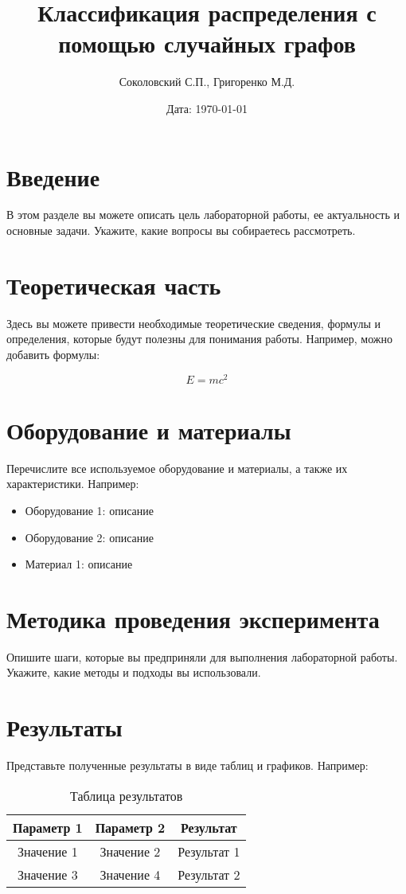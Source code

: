 \documentclass[a4paper,12pt]{article}
\title{\textbf{Классификация распределения с помощью случайных графов}}
\author{Соколовский С.П., Григоренко М.Д.}
\date{Дата: \today}
\begin{document}
\maketitle

\section{Введение}
В этом разделе вы можете описать цель лабораторной работы, ее актуальность и основные задачи. Укажите, какие вопросы вы собираетесь рассмотреть.

\section{Теоретическая часть}
Здесь вы можете привести необходимые теоретические сведения, формулы и определения, которые будут полезны для понимания работы. Например, можно добавить формулы:

\begin{equation}
E = mc^2
\end{equation}

\section{Оборудование и материалы}
Перечислите все используемое оборудование и материалы, а также их характеристики. Например:
\begin{itemize}
    \item Оборудование 1: описание
    \item Оборудование 2: описание
    \item Материал 1: описание
\end{itemize}

\section{Методика проведения эксперимента}
Опишите шаги, которые вы предприняли для выполнения лабораторной работы. Укажите, какие методы и подходы вы использовали. 

\section{Результаты}
Представьте полученные результаты в виде таблиц и графиков. Например:

\begin{table}[h]
    \centering
    \begin{tabular}{|c|c|c|}
        \hline
        Параметр 1 & Параметр 2 & Результат \\
        \hline
        Значение 1 & Значение 2 & Результат 1 \\
        Значение 3 & Значение 4 & Результат 2 \\
        \hline
    \end{tabular}
    \caption{Таблица результатов}
\end{table}
\end{document}
